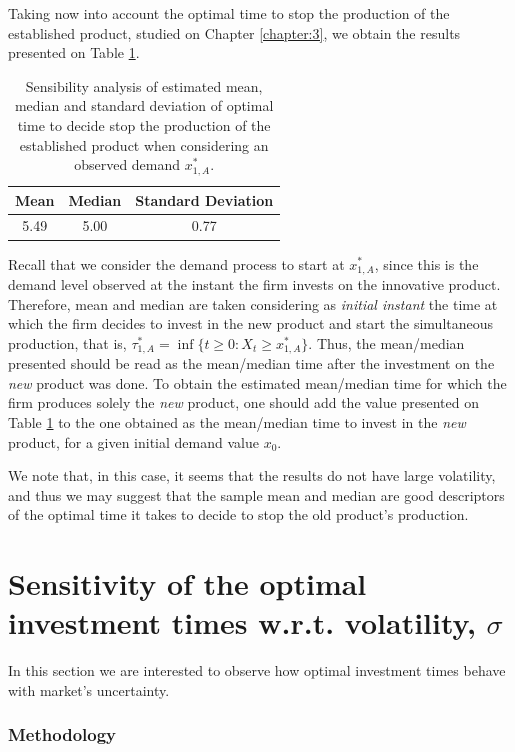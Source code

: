 Taking now into account the optimal time to stop the production of the established product, studied on Chapter \ref{chapter:3}, we obtain the results presented on Table \ref{stoptime_t}.
\begin{table}[!htb]
	\caption{Sensibility analysis of estimated mean, median and standard deviation of optimal time to decide stop the production of the established product when considering an observed demand $x_{1,A}^*$.}
	\centering
	\begin{tabular}{ccc}
		Mean & Median & Standard Deviation \\ \hline
		5.49 & 5.00 & 0.77
	\end{tabular}
\label{stoptime_t}
\end{table}

Recall that we consider the demand process to start at $x_{1,A}^*$, since this is the demand level observed at the instant the firm invests on the innovative product. Therefore, mean and median are taken considering as \textit{initial instant} the time at which the firm decides to invest in the new product and start the simultaneous production, that is, $\tau^*_{1,A}=\inf \{ t\geq 0: X_t \geq x^*_{1,A} \}$. Thus, the mean/median presented should be read as the mean/median time after the investment on the \textit{new} product was done. To obtain the estimated mean/median time for which the firm produces solely the \textit{new} product, one should add the value presented on Table \ref{stoptime_t} to the one obtained as the mean/median time to invest in the \textit{new} product, for a given initial demand value $x_0$.    

We note that, in this case, it seems that the results do not have large volatility, and thus we may suggest that the sample mean and median are good descriptors of the optimal time it takes to decide to stop the old product's production.



\section{Sensitivity of the optimal investment times w.r.t. volatility, $\sigma$}

In this section we are interested to observe how optimal investment times behave with market's uncertainty.

\subsubsection{Methodology}

